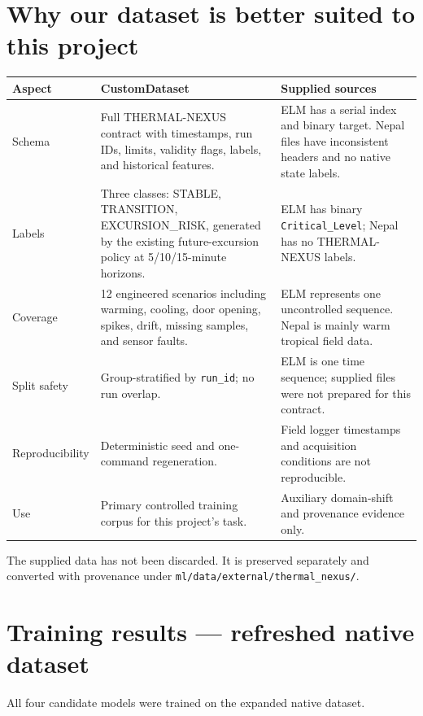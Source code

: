 \documentclass[11pt,a4paper]{article}
\begin{document}
\section{Why our dataset is better suited to this project}
\begin{center}
\begin{tabularx}{\textwidth}{l X X}
\toprule
\textbf{Aspect} & \textbf{CustomDataset} & \textbf{Supplied sources} \\
\midrule
Schema & Full THERMAL-NEXUS contract with timestamps, run IDs, limits,
validity flags, labels, and historical features. & ELM has a serial index and
binary target. Nepal files have inconsistent headers and no native state labels. \\
Labels & Three classes: STABLE, TRANSITION, EXCURSION\_RISK, generated by the
existing future-excursion policy at 5/10/15-minute horizons. & ELM has binary
\texttt{Critical\_Level}; Nepal has no THERMAL-NEXUS labels. \\
Coverage & 12 engineered scenarios including warming, cooling, door opening,
spikes, drift, missing samples, and sensor faults. & ELM represents one
uncontrolled sequence. Nepal is mainly warm tropical field data. \\
Split safety & Group-stratified by \texttt{run\_id}; no run overlap. & ELM is
one time sequence; supplied files were not prepared for this contract. \\
Reproducibility & Deterministic seed and one-command regeneration. & Field
logger timestamps and acquisition conditions are not reproducible. \\
Use & Primary controlled training corpus for this project's task. & Auxiliary
domain-shift and provenance evidence only. \\
\bottomrule
\end{tabularx}
\end{center}
The supplied data has not been discarded. It is preserved separately and
converted with provenance under \texttt{ml/data/external/thermal\_nexus/}.

\section{Training results --- refreshed native dataset}
All four candidate models were trained on the expanded native dataset.
\end{document}
